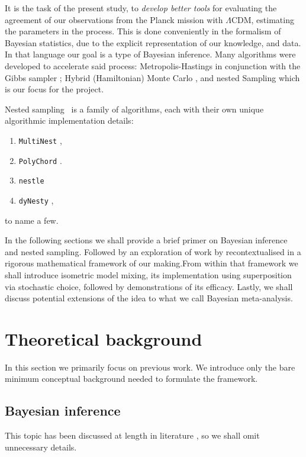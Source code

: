 \documentclass[usenatbib]{mnras}
\begin{document}
It is the task of the present study, to \emph{develop better tools}
for evaluating the agreement of our observations from the Planck
mission with \(\Lambda\)CDM, estimating the parameters in the process.
This is done conveniently in the formalism of Bayesian statistics, due
to the explicit representation of our knowledge, and data. In that
language our goal is a type of Bayesian inference. Many algorithms
were developed to accelerate said process: Metropolis-Hastings
\citep{Metropolis} in conjunction with the Gibbs sampler
\citep{Metropolis-Hastings-Gibbs}; Hybrid (Hamiltonian) Monte Carlo
\citep{1701.02434,Duane_1987}, and nested Sampling
\citep{Skilling2006} which is our focus for the project. 

Nested sampling~\cite{Skilling2006} is a family of algorithms, each
with their own unique algorithmic implementation details:
\begin{enumerate}
\item \texttt{MultiNest} \citep{Feroz2009MultiNestAE},
\item \texttt{PolyChord} \citep{polychord}.
\item \texttt{nestle} \citep{nestle}
\item \texttt{dyNesty} \citep{Speagle_2020},
\end{enumerate}
to name a few.  

In the following sections we shall provide a brief primer on Bayesian
inference and nested sampling. Followed by an exploration of work by
\cite{chen-ferroz-hobson} recontextualised in a rigorous mathematical
framework of our making.From within that framework we shall introduce
isometric model mixing, its implementation using superposition via
stochastic choice, followed by demonstrations of its efficacy. Lastly,
we shall discuss potential extensions of the idea to what we call
Bayesian meta-analysis.

\section{Theoretical background}\label{sec:orge6061a4}
In this section we primarily focus on previous work. We introduce only
the bare minimum conceptual background needed to formulate the
framework.

\subsection{Bayesian inference}\label{sec:org6b7d2fe}

This topic has been discussed at length in literature
\citep{jeffreys2010scientific}, so we shall omit unnecessary details.
\end{document}

